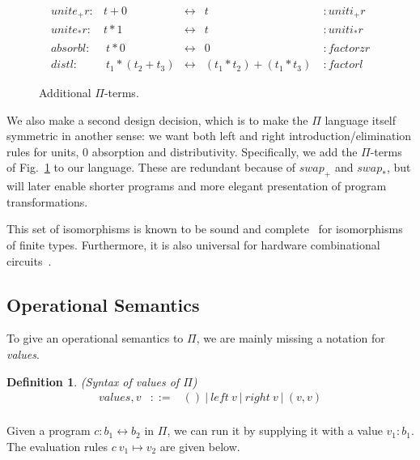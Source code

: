 \documentclass{article}
\newtheorem{definition}[theorem]{Definition}
\newcommand{\identlsp}{\ensuremath{\mathit{unite}_+\mathit{r}}}
\newcommand{\identrsp}{\ensuremath{\mathit{uniti}_+\mathit{r}}}
\newcommand{\swapp}{\ensuremath{\mathit{swap}_+}}
\newcommand{\identlst}{\ensuremath{\mathit{unite}_*\mathit{r}}}
\newcommand{\identrst}{\ensuremath{\mathit{uniti}_*\mathit{r}}}
\newcommand{\swapt}{\ensuremath{\mathit{swap}_*}}
\newcommand{\absorbl}{\ensuremath{\mathit{absorbl}}}
\newcommand{\factorzr}{\ensuremath{\mathit{factorzr}}}
\newcommand{\distl}{\ensuremath{\mathit{distl}}}
\newcommand{\factorl}{\ensuremath{\mathit{factorl}}}
\newcommand{\iso}{\leftrightarrow}
\newcommand{\jc}[1]{\fbox{Jacques says:} \textbf{#1}}
\begin{document}
\begin{figure}[t]
\[
\begin{array}{rrcll}
\identlsp :&  t + 0 & \iso & t &: \identrsp \\
\identlst :&  t * 1 & \iso & t &: \identrst \\
\\
\absorbl :&~ t * 0 & \iso & 0 ~ &: \factorzr \\
\distl :&~ t_1 * (t_2 + t_3) & \iso & (t_1 * t_2) + (t_1 * t_3)~ &: \factorl
\end{array}
\]
\caption{Additional $\Pi$-terms.}
\label{more-pi}
\end{figure}

We also make a second design decision, which is to make the $\Pi$
language itself symmetric in another sense: we want both left
and right introduction/elimination rules for units, $0$ absorption
and distributivity. Specifically, we add the $\Pi$-terms of
Fig.~\ref{more-pi} to our language. These are redundant because
of $\swapp$ and $\swapt$, but will later enable shorter programs
and more elegant presentation of program transformations.

This set of isomorphisms is known to be sound and
complete~\cite{Fiore:2004,fiore-remarks} for isomorphisms
of finite types.  Furthermore, it is also universal
for hardware combinational
circuits~\cite{James:2012:IE:2103656.2103667}.

\subsection{Operational Semantics}
\label{sec:opsem}


To give an operational semantics to $\Pi$, we are mainly missing
a notation for \emph{values}.

\begin{definition}{(Syntax of values of \ensuremath{\Pi })}
\label{def:langRev}
\[\begin{array}{rclr}
 \mathit{values}, v &::=& () ~|~ \mathit{left} ~v ~|~ \mathit{right} ~v ~|~ (v,v) \\
 \end{array}\]
\end{definition}

Given a program \ensuremath{c : b_1 \leftrightarrow b_2} in \ensuremath{\Pi },
we can run it by supplying it with a value \ensuremath{ v_1 : b_1}. The
evaluation rules \ensuremath{c ~v_1 \mapsto v_2} are given below.
\end{document}
